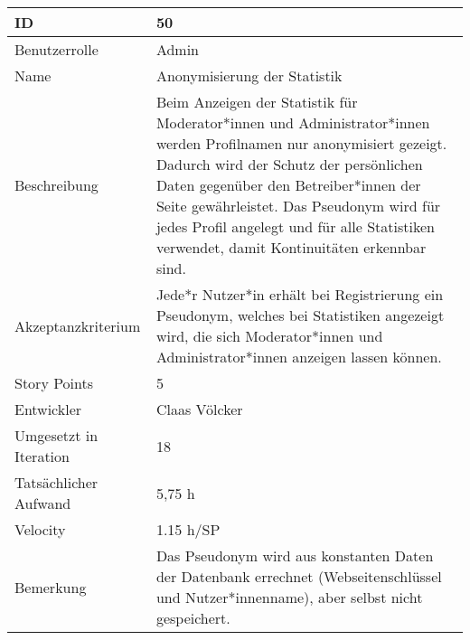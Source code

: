 \begin{tabularx}{\textwidth}{|p{}|X|}
	\hline
	ID & 50\\
	\hline
	Benutzerrolle & Admin\\
	\hline
	Name & Anonymisierung der Statistik\\
	\hline
	Beschreibung & Beim Anzeigen der Statistik für Moderator*innen und Administrator*innen werden Profilnamen nur anonymisiert gezeigt. Dadurch wird der Schutz der persönlichen Daten gegenüber den Betreiber*innen der Seite gewährleistet. Das Pseudonym wird für jedes Profil angelegt und für alle Statistiken verwendet, damit Kontinuitäten erkennbar sind.\\
	\hline
	Akzeptanzkriterium & Jede*r Nutzer*in erhält bei Registrierung ein Pseudonym, welches bei Statistiken angezeigt wird, die sich Moderator*innen und Administrator*innen anzeigen lassen können.\\
	\hline
	Story Points & 5\\
	\hline
	Entwickler & Claas Völcker\\
	\hline
	Umgesetzt in Iteration & 18\\
	\hline
	Tatsächlicher Aufwand & 5,75 h\\
	\hline
	Velocity & 1.15 h/SP\\
	\hline
	Bemerkung & Das Pseudonym wird aus konstanten Daten der Datenbank errechnet (Webseitenschlüssel und Nutzer*innenname), aber selbst nicht gespeichert.\\
	\hline
\end{tabularx}
\vspace{20pt}
